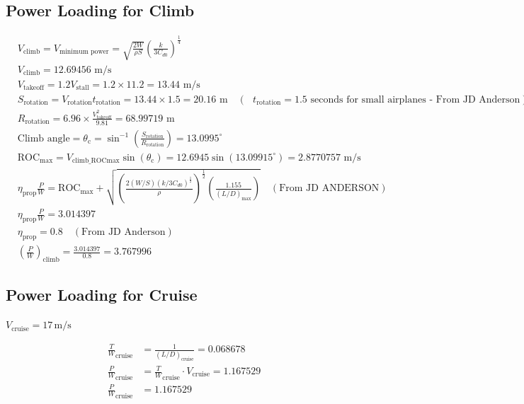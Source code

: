 \documentclass[12 pt]{article}
\begin{document}
\subsection {Power Loading for Climb}
\textsc{}
\begin{align*}
& V_{\text{climb}} = V_{\text{minimum power}} = \sqrt{\frac{2W}{\rho S}} \left(\frac{k}{3C_{d0}}\right)^{\frac{1}{4}} \\
& V_{\text{climb}} = 12.69456 \text{ m/s} \\
& V_{\text{takeoff}} = 1.2 V_{\text{stall}} = 1.2 \times 11.2 = 13.44 \text{ m/s} \\
& S_{\text{rotation}} = V_{\text{rotation}} t_{\text{rotation}} = 13.44 \times 1.5 = 20.16 \text{ m} \quad (\text{ } t_{\text{rotation}} = 1.5 \text{ seconds for small airplanes - From JD Anderson}) \\
& R_{\text{rotation}} = 6.96 \times \frac{V_{\text{takeoff}}^2}{9.81} = 68.99719 \text{ m} \\
& \text{Climb angle} = \theta_{\text{c}} = \sin^{-1}\left(\frac{S_{\text{rotation}}}{R_{\text{rotation}}}\right) = 13.0995^\circ \\
& \text{ROC}_{\text{max}} = V_{\text{climb\_ROCmax}} \sin(\theta_{\text{c}}) = 12.6945 \sin(13.09915^\circ) = 2.8770757 \text{ m/s} \\
& \eta_{\text{prop}} \frac{P}{W} = \text{ROC}_{\text{max}} + \sqrt{\left(\frac{2(W/S) (k/3C_{d0})^{\frac{1}{2}}}{\rho}\right)^{\frac{1}{2}} \left(\frac{1.155}{(L/D)_{\text{max}}}\right)} \quad (\text{From JD ANDERSON}) \\
& \eta_{\text{prop}} \frac{P}{W} = 3.014397 \\
& \eta_{\text{prop}} = 0.8 \quad (\text{From JD Anderson}) \\
& \left(\frac{P}{W}\right)_{\text{climb}} = \frac{3.014397}{0.8} = 3.767996
\end{align*}
\subsection {Power Loading for Cruise}

\begin{center}
$V_{\text{cruise}} = 17 \, \text{m/s}$
\end{center}
\begin{align*}
\frac{T}{W}_{\text{cruise}} &= \frac{1}{(L/D)_{\text{cruise}}} = 0.068678 \\
\frac{P}{W}_{\text{cruise}} &= \frac{T}{W}_{\text{cruise}} \cdot V_{\text{cruise}} = 1.167529 \\
\frac{P}{W}_{\text{cruise}} &= 1.167529 \\
\end{align*}
\end{document}
